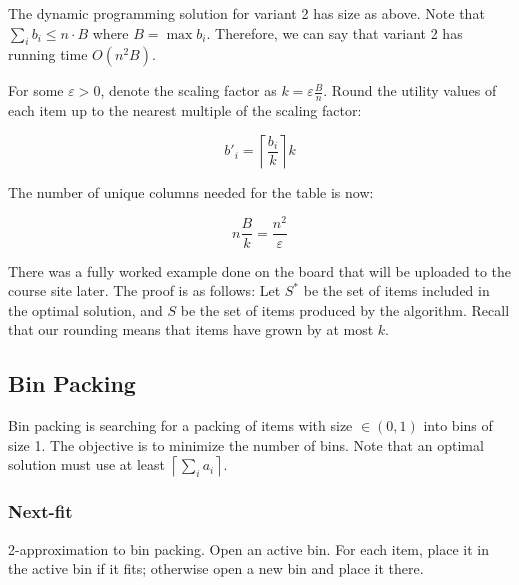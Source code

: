 \documentclass{idc_msc}
\begin{document}
The dynamic programming solution for variant 2 has size as above.
Note that \(\sum_i b_i \le n \cdot B\) where \(B = \max b_i\).
Therefore, we can say that variant 2 has running time \(O(n^2 B)\).

For some \(\varepsilon > 0\), denote the scaling factor as \(k=\varepsilon \frac{B}{n}\).
Round the utility values of each item up to the nearest multiple of the scaling factor:

\[b'_i = \left\lceil\frac{b_i}{k}\right\rceil k\]

The number of unique columns needed for the table is now:

\[n \frac{B}{k} = \frac{n^2}{\varepsilon}\]

There was a fully worked example done on the board that will be uploaded to the course site later.
The proof is as follows:
Let \(S^*\) be the set of items included in the optimal solution, and \(S\) be the set of items produced by the algorithm.
Recall that our rounding means that items have grown by at most \(k\).





\subsection{Bin Packing}

Bin packing is searching for a packing of items with size \(\in (0,1)\) into bins of size 1.
The objective is to minimize the number of bins.
Note that an optimal solution must use at least \(\left\lceil\sum_i a_i\right\rceil\).

\subsubsection{Next-fit}

2-approximation to bin packing.
Open an active bin.
For each item, place it in the active bin if it fits; otherwise open a new bin and place it there.
\end{document}
